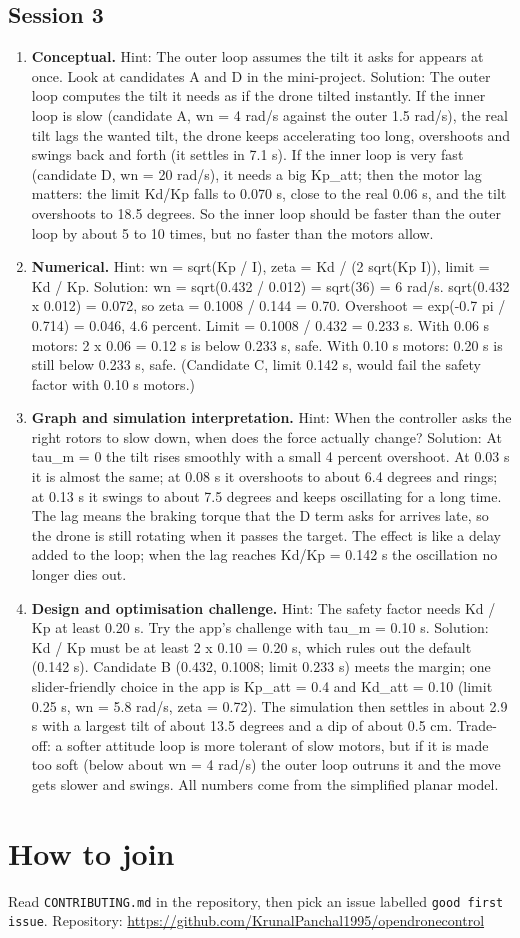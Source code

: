 \documentclass[11pt,a4paper]{article}
\begin{document}
\subsection*{Session 3}
\begin{enumerate}[nosep]
\item \textbf{Conceptual.} Hint: The outer loop assumes the tilt it asks for appears at once. Look at candidates A and D in the mini-project. Solution: The outer loop computes the tilt it needs as if the drone tilted instantly. If the inner loop is slow (candidate A, wn = 4 rad/s against the outer 1.5 rad/s), the real tilt lags the wanted tilt, the drone keeps accelerating too long, overshoots and swings back and forth (it settles in 7.1 s). If the inner loop is very fast (candidate D, wn = 20 rad/s), it needs a big Kp\_att; then the motor lag matters: the limit Kd/Kp falls to 0.070 s, close to the real 0.06 s, and the tilt overshoots to 18.5 degrees. So the inner loop should be faster than the outer loop by about 5 to 10 times, but no faster than the motors allow.
\item \textbf{Numerical.} Hint: wn = sqrt(Kp / I), zeta = Kd / (2 sqrt(Kp I)), limit = Kd / Kp. Solution: wn = sqrt(0.432 / 0.012) = sqrt(36) = 6 rad/s. sqrt(0.432 x 0.012) = 0.072, so zeta = 0.1008 / 0.144 = 0.70. Overshoot = exp(-0.7 pi / 0.714) = 0.046, 4.6 percent. Limit = 0.1008 / 0.432 = 0.233 s. With 0.06 s motors: 2 x 0.06 = 0.12 s is below 0.233 s, safe. With 0.10 s motors: 0.20 s is still below 0.233 s, safe. (Candidate C, limit 0.142 s, would fail the safety factor with 0.10 s motors.)
\item \textbf{Graph and simulation interpretation.} Hint: When the controller asks the right rotors to slow down, when does the force actually change? Solution: At tau\_m = 0 the tilt rises smoothly with a small 4 percent overshoot. At 0.03 s it is almost the same; at 0.08 s it overshoots to about 6.4 degrees and rings; at 0.13 s it swings to about 7.5 degrees and keeps oscillating for a long time. The lag means the braking torque that the D term asks for arrives late, so the drone is still rotating when it passes the target. The effect is like a delay added to the loop; when the lag reaches Kd/Kp = 0.142 s the oscillation no longer dies out.
\item \textbf{Design and optimisation challenge.} Hint: The safety factor needs Kd / Kp at least 0.20 s. Try the app's challenge with tau\_m = 0.10 s. Solution: Kd / Kp must be at least 2 x 0.10 = 0.20 s, which rules out the default (0.142 s). Candidate B (0.432, 0.1008; limit 0.233 s) meets the margin; one slider-friendly choice in the app is Kp\_att = 0.4 and Kd\_att = 0.10 (limit 0.25 s, wn = 5.8 rad/s, zeta = 0.72). The simulation then settles in about 2.9 s with a largest tilt of about 13.5 degrees and a dip of about 0.5 cm. Trade-off: a softer attitude loop is more tolerant of slow motors, but if it is made too soft (below about wn = 4 rad/s) the outer loop outruns it and the move gets slower and swings. All numbers come from the simplified planar model.
\end{enumerate}

\section{How to join}
Read \texttt{CONTRIBUTING.md} in the repository, then pick an issue labelled \texttt{good first issue}. Repository: \url{https://github.com/KrunalPanchal1995/opendronecontrol}
\end{document}
